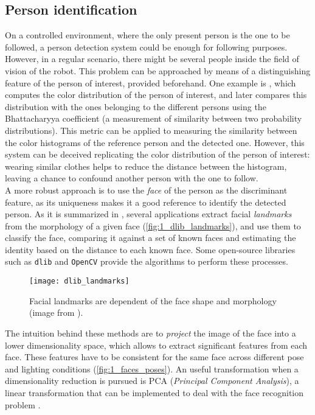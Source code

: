 \subsection{Person identification}
On a controlled environment, where the only present person is the one to be followed, a person detection system could be enough for following purposes. However, in a regular scenario, there might be several people inside the field of vision of the robot. This problem can be approached by means of a distinguishing feature of the person of interest, provided beforehand. One example is \cite{color_id}, which computes the color distribution of the person of interest, and later compares this distribution with the ones belonging to the different persons using the Bhattacharyya coefficient \cite{bhattacharyya} (a measurement of similarity between two probability distributions). This metric can be applied to measuring the similarity between the color histograms of the reference person and the detected one. However, this system can be deceived replicating the color distribution of the person of interest: wearing similar clothes helps to reduce the distance between the histogram, leaving a chance to confound another person with the one to follow.\\

A more robust approach is to use the \textit{face} of the person as the discriminant feature, as its uniqueness makes it a good reference to identify the detected person. As it is summarized in \cite{dlib_review}, several applications extract facial \textit{landmarks} from the morphology of a given face (\autoref{fig:1_dlib_landmarks}), and use them to classify the face, comparing it against a set of known faces and estimating the identity based on the distance to each known face. Some open-source libraries such as \texttt{dlib} and \texttt{OpenCV} provide the algorithms to perform these processes.\\

\begin{figure}[h]
	\centering
	\texttt{[image: dlib\_landmarks]}
	\caption{Facial landmarks are dependent of the face shape and morphology (image from \cite{dlib_review}).}
	\label{fig:1_dlib_landmarks}
\end{figure}


The intuition behind these methods are to \textit{project} the image of the face into a lower dimensionality space, which allows to extract significant features from each face. These features have to be consistent for the same face across different pose and lighting conditions (\autoref{fig:1_faces_poses}). An useful transformation when a dimensionality reduction is pursued is PCA (\textit{Principal Component Analysis}), a linear transformation that can be implemented to deal with the face recognition problem \cite{face_pca}.

